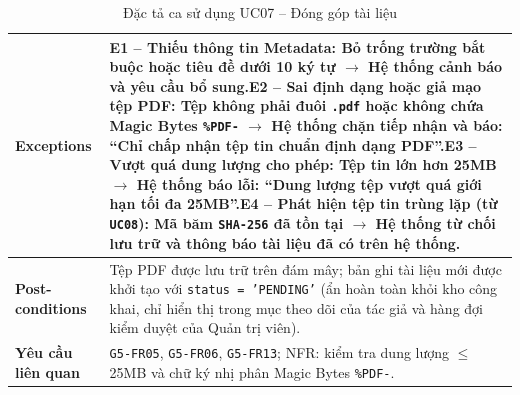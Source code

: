 \begin{table}[H]
\begin{tabularx}{\textwidth}{|p{3.5cm}|X|}
\hline
\textbf{Exceptions} & E1 -- Thiếu thông tin Metadata: Bỏ trống trường bắt buộc hoặc tiêu đề dưới 10 ký tự $\rightarrow$ Hệ thống cảnh báo và yêu cầu bổ sung.\newline E2 -- Sai định dạng hoặc giả mạo tệp PDF: Tệp không phải đuôi \texttt{.pdf} hoặc không chứa Magic Bytes \texttt{\%PDF-} $\rightarrow$ Hệ thống chặn tiếp nhận và báo: ``Chỉ chấp nhận tệp tin chuẩn định dạng PDF''.\newline E3 -- Vượt quá dung lượng cho phép: Tệp tin lớn hơn 25MB $\rightarrow$ Hệ thống báo lỗi: ``Dung lượng tệp vượt quá giới hạn tối đa 25MB''.\newline E4 -- Phát hiện tệp tin trùng lặp (từ \texttt{UC08}): Mã băm \texttt{SHA-256} đã tồn tại $\rightarrow$ Hệ thống từ chối lưu trữ và thông báo tài liệu đã có trên hệ thống. \\
\hline
\textbf{Post-conditions} & Tệp PDF được lưu trữ trên đám mây; bản ghi tài liệu mới được khởi tạo với \texttt{status = 'PENDING'} (ẩn hoàn toàn khỏi kho công khai, chỉ hiển thị trong mục theo dõi của tác giả và hàng đợi kiểm duyệt của Quản trị viên). \\
\hline
\textbf{Yêu cầu liên quan} & \texttt{G5-FR05}, \texttt{G5-FR06}, \texttt{G5-FR13}; NFR: kiểm tra dung lượng $\le$ 25MB và chữ ký nhị phân Magic Bytes \texttt{\%PDF-}. \\
\hline
\end{tabularx}
\caption{Đặc tả ca sử dụng UC07 -- Đóng góp tài liệu}
\label{tab:uc07}
\end{table}


